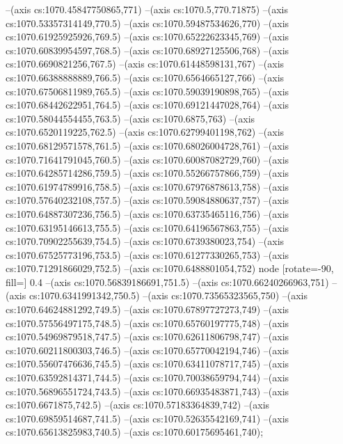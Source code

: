--(axis cs:1070.45847750865,771)
--(axis cs:1070.5,770.71875)
--(axis cs:1070.53357314149,770.5)
--(axis cs:1070.59487534626,770)
--(axis cs:1070.61925925926,769.5)
--(axis cs:1070.65222623345,769)
--(axis cs:1070.60839954597,768.5)
--(axis cs:1070.68927125506,768)
--(axis cs:1070.6690821256,767.5)
--(axis cs:1070.61448598131,767)
--(axis cs:1070.66388888889,766.5)
--(axis cs:1070.6564665127,766)
--(axis cs:1070.67506811989,765.5)
--(axis cs:1070.59039190898,765)
--(axis cs:1070.68442622951,764.5)
--(axis cs:1070.69121447028,764)
--(axis cs:1070.58044554455,763.5)
--(axis cs:1070.6875,763)
--(axis cs:1070.6520119225,762.5)
--(axis cs:1070.62799401198,762)
--(axis cs:1070.68129571578,761.5)
--(axis cs:1070.68026004728,761)
--(axis cs:1070.71641791045,760.5)
--(axis cs:1070.60087082729,760)
--(axis cs:1070.64285714286,759.5)
--(axis cs:1070.55266757866,759)
--(axis cs:1070.61974789916,758.5)
--(axis cs:1070.67976878613,758)
--(axis cs:1070.57640232108,757.5)
--(axis cs:1070.59084880637,757)
--(axis cs:1070.64887307236,756.5)
--(axis cs:1070.63735465116,756)
--(axis cs:1070.63195146613,755.5)
--(axis cs:1070.64196567863,755)
--(axis cs:1070.70902255639,754.5)
--(axis cs:1070.6739380023,754)
--(axis cs:1070.67525773196,753.5)
--(axis cs:1070.61277330265,753)
--(axis cs:1070.71291866029,752.5)
--(axis cs:1070.6488801054,752) node [rotate=-90, fill=\bgcol] {0.4}
--(axis cs:1070.56839186691,751.5)
--(axis cs:1070.66240266963,751)
--(axis cs:1070.6341991342,750.5)
--(axis cs:1070.73565323565,750)
--(axis cs:1070.64624881292,749.5)
--(axis cs:1070.67897727273,749)
--(axis cs:1070.57556497175,748.5)
--(axis cs:1070.65760197775,748)
--(axis cs:1070.54969879518,747.5)
--(axis cs:1070.62611806798,747)
--(axis cs:1070.60211800303,746.5)
--(axis cs:1070.65770042194,746)
--(axis cs:1070.55607476636,745.5)
--(axis cs:1070.63411078717,745)
--(axis cs:1070.63592814371,744.5)
--(axis cs:1070.70038659794,744)
--(axis cs:1070.56896551724,743.5)
--(axis cs:1070.66935483871,743)
--(axis cs:1070.6671875,742.5)
--(axis cs:1070.57183364839,742)
--(axis cs:1070.69859514687,741.5)
--(axis cs:1070.52635542169,741)
--(axis cs:1070.65613825983,740.5)
--(axis cs:1070.60175695461,740);

